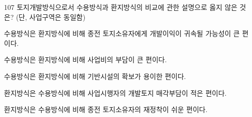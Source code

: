 \begin{question}{107}
토지개발방식으로서 수용방식과 환지방식의 비교에 관한 설명으로 옳지 않은 것은? (단, 사업구역은 동일함)
\begin{choices}
  \item 수용방식은 환지방식에 비해 종전 토지소유자에게 개발이익이 귀속될 가능성이 큰 편이다.
  \item 수용방식은 환지방식에 비해 사업비의 부담이 큰 편이다.
  \item 수용방식은 환지방식에 비해 기반시설의 확보가 용이한 편이다.
  \item 환지방식은 수용방식에 비해 사업시행자의 개발토지 매각부담이 적은 편이다.
  \item 환지방식은 수용방식에 비해 종전 토지소유자의 재정착이 쉬운 편이다.
\end{choices}
\end{question}
